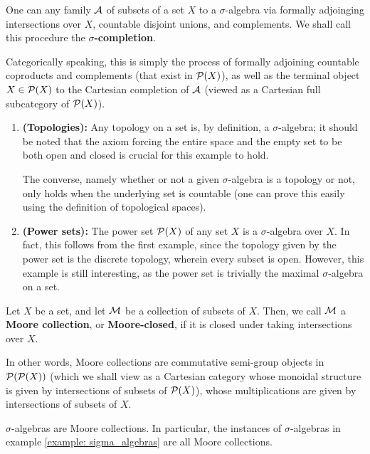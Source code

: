         \begin{remark}
            One can  any family $\mathcal{A}$ of subsets of a set $X$ to a $\sigma$-algebra via formally adjoinging intersections over $X$, countable disjoint unions, and complements. We shall call this procedure the \textbf{$\sigma$-completion}.
            
            Categorically speaking, this is simply the process of formally adjoining countable coproducts and complements (that exist in $\mathcal{P}(X)$), as well as the terminal object $X \in \mathcal{P}(X)$ to the Cartesian completion of $\mathcal{A}$ (viewed as a Cartesian full subcategory of $\mathcal{P}(X)$). 
        \end{remark}
        \begin{example} \label{example: sigma_algebras}
            \noindent
            \begin{enumerate}
                \item \textbf{(Topologies):} Any topology on a set is, by definition, a $\sigma$-algebra; it should be noted that the axiom forcing the entire space and the empty set to be both open and closed is crucial for this example to hold.
                
                The converse, namely whether or not a given $\sigma$-algebra is a topology or not, only holds when the underlying set is countable (one can prove this easily using the definition of topological spaces).
                \item \textbf{(Power sets):} The power set $\mathcal{P}(X)$ of any set $X$ is a $\sigma$-algebra over $X$. In fact, this follows from the first example, since the topology given by the power set is the discrete topology, wherein every subset is open. However, this example is still interesting, as the power set is trivially the maximal $\sigma$-algebra on a set.
            \end{enumerate}
        \end{example}
        
        \begin{definition} \label{def: moore_closure}
            Let $X$ be a set, and let $\mathcal{M}$ be a collection of subsets of $X$. Then, we call $\mathcal{M}$ a \textbf{Moore collection}, or \textbf{Moore-closed}, if it is closed under taking intersections over $X$. 
            
            In other words, Moore collections are commutative semi-group objects in $\mathcal{P}(\mathcal{P}(X))$ (which we shall view as a Cartesian category whose monoidal structure is given by intersections of subsets of $\mathcal{P}(X)$), whose multiplications are given by intersections of subsets of $X$.
        \end{definition}
        \begin{example}
            $\sigma$-algebras are Moore collections. In particular, the instances of $\sigma$-algebras in example \ref{example: sigma_algebras} are all Moore collections.
        \end{example}
        
